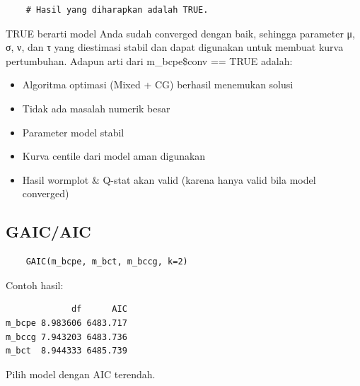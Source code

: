 \documentclass[11pt, a4paper]{article}
\begin{document}
\begin{enumerate}
\begin{lstlisting}
    # Hasil yang diharapkan adalah TRUE.
    \end{lstlisting}
TRUE berarti model Anda sudah converged dengan baik, sehingga parameter μ, σ, ν, dan τ yang diestimasi stabil dan dapat digunakan untuk membuat kurva pertumbuhan. Adapun arti dari m\_bcpe\$conv == TRUE adalah:
\begin{itemize}
\item Algoritma optimasi (Mixed + CG) berhasil menemukan solusi
\item Tidak ada masalah numerik besar
\item Parameter model stabil
\item Kurva centile dari model aman digunakan
\item Hasil wormplot \& Q-stat akan valid (karena hanya valid bila model converged)
\end{itemize}

\subsection{GAIC/AIC}
    \begin{lstlisting}
    GAIC(m_bcpe, m_bct, m_bccg, k=2)
    \end{lstlisting}
Contoh hasil:
\begin{Verbatim}
             df      AIC
m_bcpe 8.983606 6483.717
m_bccg 7.943203 6483.736
m_bct  8.944333 6485.739
\end{Verbatim}
Pilih model dengan AIC terendah.

\end{enumerate}
\end{document}
